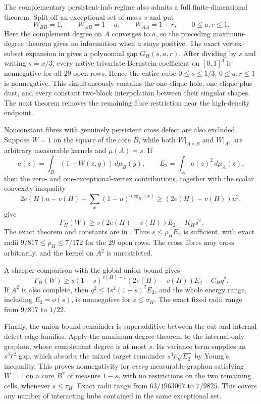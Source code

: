 \documentclass[11pt]{article}
\begin{document}
The complementary persistent-hub regime also admits a full finite-dimensional
theorem.  Split off an exceptional set of mass $s$ and put
\[
 W_{BB}=1,
 \qquad W_{AB}=1-a,
 \qquad W_{AA}=1-r,
 \qquad0\leq a,r\leq1.
\]
Here the complement degree on $A$ converges to $a$, so the preceding
maximum-degree theorem gives no information when $a$ stays positive.  The
exact vertex-subset expansion in
 gives a polynomial gap
$G_H(s,a,r)$.  After dividing by $s$ and writing $s=x/3$, every native
trivariate Bernstein coefficient on $[0,1]^3$ is nonnegative for all $29$
open rows.  Hence the entire cube $0\leq s\leq1/3$, $0\leq a,r\leq1$ is
nonnegative.  This simultaneously contains the one-clique hole, one clique
plus dust, and every constant two-block interpolation between their singular
shapes.  The next theorem removes the remaining fibre restriction near the
high-density endpoint.

Nonconstant fibres with genuinely persistent cross defect are also excluded.
Suppose $W=1$ on the square of the core $B$, while both $W|_{A\times B}$ and
$W|_{A^2}$ are arbitrary measurable kernels and $\mu(A)=s$.  If
\[
 a(z)=\int_B(1-W(z,y))\,d\mu_B(y),
 \qquad E_2=\int_Aa(z)^2\,d\mu_A(z),
\]
then the zero- and one-exceptional-vertex contributions, together with the
scalar convexity inequality
\[
 2e(H)u-v(H)+\sum_x(1-u)^{\deg_H(x)}
 \geq(2e(H)-v(H))u^2,
\]
give
\[
 \Gamma_H(W)\geq
 s(2e(H)-v(H))E_2-K_Hs^2.
\]
The exact theorem and constants are in
.  Thus
$s\leq\rho_HE_2$ is sufficient, with exact radii $9/817\leq\rho_H\leq7/172$
for the $29$ open rows.  The cross fibres may cross arbitrarily, and the
kernel on $A^2$ is unrestricted.

A sharper comparison with the global union bound gives
\[
 \Gamma_H(W)\geq
 s(1-s)^{v(H)-1}(2e(H)-v(H))E_2-C_Hq^2.
\]
If $A^2$ is also complete, then
$q^2\leq4s^2(1-s)^2E_2$, and the whole energy range, including
$E_2=o(s)$, is nonnegative for $s\leq\sigma_H$.  The exact fixed radii range
from $9/817$ to $1/22$.

Finally, the union-bound remainder is superadditive between the cut and
internal defect-edge families.  Apply the maximum-degree theorem to the
internal-only graphon, whose complement degree is at most $s$.  Its variance
term supplies an $s^3\bar r^2$ gap, which absorbs the mixed target remainder
$s^3\bar r\sqrt{E_2}$ by Young's inequality.  This proves nonnegativity for
\emph{every} measurable graphon satisfying $W=1$ on a core $B^2$ of measure
$1-s$, with no restrictions on the two remaining cells, whenever
$s\leq\tau_H$.  Exact radii range from $63/1963067$ to $7/9825$.  This covers
any number of interacting hubs contained in the same exceptional set.
\end{document}

